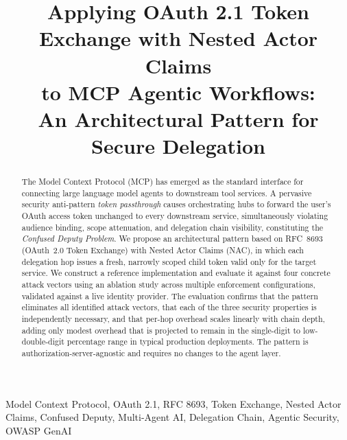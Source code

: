 \documentclass[journal]{IEEEtran}
\begin{document}
\title{Applying OAuth 2.1 Token Exchange with Nested Actor Claims\\
to MCP Agentic Workflows:\\
An Architectural Pattern for Secure Delegation}

\author{
}

\maketitle

\begin{abstract}
The Model Context Protocol (MCP) has emerged as the standard interface for
connecting large language model agents to downstream tool services. A pervasive
security anti-pattern \textit{token passthrough} causes orchestrating hubs
to forward the user's OAuth access token unchanged to every downstream service,
simultaneously violating audience binding, scope attenuation, and delegation
chain visibility, constituting the \textit{Confused Deputy Problem}. We propose
an architectural pattern based on RFC~8693 (OAuth~2.0 Token Exchange) with
Nested Actor Claims (NAC), in which each delegation hop issues a fresh,
narrowly scoped child token valid only for the target service. We construct a
reference implementation and evaluate it against four concrete attack vectors
using an ablation study across multiple enforcement configurations, validated
against a live identity provider. The evaluation confirms that the pattern
eliminates all identified attack vectors, that each of the three security
properties is independently necessary, and that per-hop overhead scales
linearly with chain depth, adding only modest overhead that is projected to
remain in the single-digit to low-double-digit percentage range in typical
production deployments. The pattern is authorization-server-agnostic and
requires no changes to the agent layer.
\end{abstract}

\begin{IEEEkeywords}
Model Context Protocol, OAuth 2.1, RFC 8693, Token Exchange, Nested Actor Claims,
Confused Deputy, Multi-Agent AI, Delegation Chain, Agentic Security, OWASP GenAI
\end{IEEEkeywords}
\end{document}
